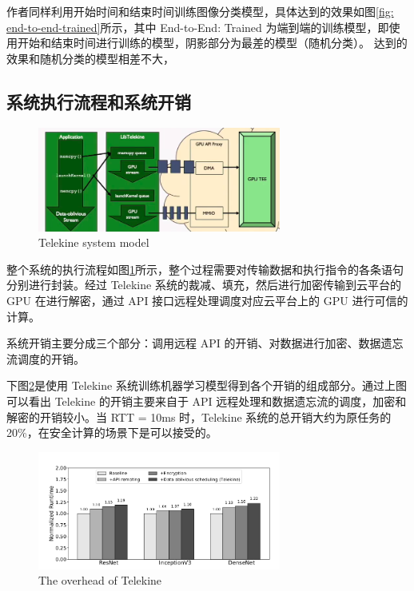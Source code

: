\documentclass{ctexart}
\begin{document}
作者同样利用开始时间和结束时间训练图像分类模型，具体达到的效果如图\ref{fig: end-to-end-trained}所示，其中 End-to-End: Trained 为端到端的训练模型，即使用开始和结束时间进行训练的模型，阴影部分为最差的模型（随机分类）。
达到的效果和随机分类的模型相差不大，

\subsection{系统执行流程和系统开销}

\begin{figure}
    \centering
    \includegraphics[width=8cm]{images/telekine-system-model.png}
    \caption{Telekine system model}
    \label{fig: system-model}
\end{figure}

整个系统的执行流程如图\ref{fig: system-model}所示，整个过程需要对传输数据和执行指令的各条语句分别进行封装。经过 Telekine 系统的裁减、填充，然后进行加密传输到云平台的 GPU 在进行解密，通过 API 接口远程处理调度对应云平台上的 GPU 进行可信的计算。

系统开销主要分成三个部分：调用远程 API 的开销、对数据进行加密、数据遗忘流调度的开销。

下图\ref{fig: overhead}是使用 Telekine 系统训练机器学习模型得到各个开销的组成部分。通过上图可以看出 Telekine 的开销主要来自于 API 远程处理和数据遗忘流的调度，加密和解密的开销较小。当 RTT = 10ms 时，Telekine 系统的总开销大约为原任务的 20\%，在安全计算的场景下是可以接受的。

\begin{figure}
    \centering
    \includegraphics[width=8cm]{images/overhead.png}
    \caption{The overhead of Telekine}
    \label{fig: overhead}
\end{figure}
\end{document}
